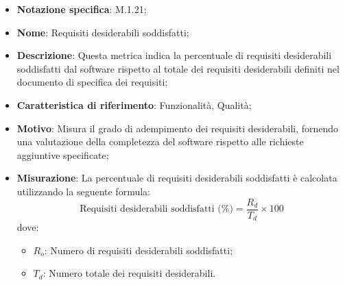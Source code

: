 \begin{itemize}
    \item \textbf{Notazione specifica}: M.1.21;
    \item \textbf{Nome}: Requisiti desiderabili soddisfatti;
    \item \textbf{Descrizione}: Questa metrica indica la percentuale di requisiti desiderabili soddisfatti dal software rispetto al totale dei requisiti desiderabili definiti nel documento di specifica dei requisiti;
    \item \textbf{Caratteristica di riferimento}: Funzionalità, Qualità;
    \item \textbf{Motivo}: Misura il grado di adempimento dei requisiti desiderabili, fornendo una valutazione della completezza del software rispetto alle richieste aggiuntive specificate;
    \item \textbf{Misurazione}: La percentuale di requisiti desiderabili soddisfatti è calcolata utilizzando la seguente formula:
    \[
    \text{Requisiti desiderabili soddisfatti (\%)} = \frac{R_{d}}{T_{d}} \times 100
    \]
    dove:
    \begin{itemize}
        \item $R_{o}$: Numero di requisiti desiderabili soddisfatti;
        \item $T_{d}$: Numero totale dei requisiti desiderabili.
    \end{itemize}
    
\end{itemize}
